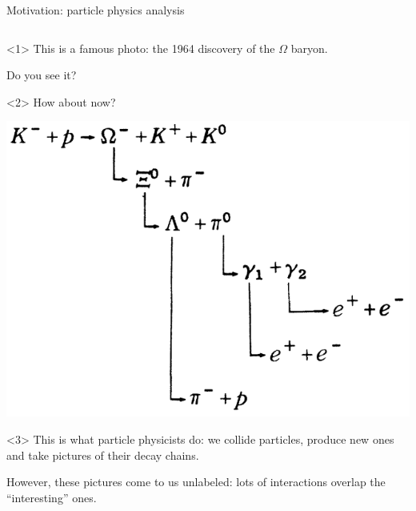 \documentclass[aspectratio=169]{beamer}
\begin{document}
\begin{frame}{Motivation: particle physics analysis}
\begin{columns}
\begin{center}
\begin{onlyenv}<1>
This is a famous photo: the 1964 discovery of the $\Omega$ baryon.

\vspace{1 cm}
Do you see it?

\vspace{1 cm}
\end{onlyenv}\begin{onlyenv}<2>
How about now?

\vspace{0.5 cm}
\includegraphics[width=\linewidth]{decay-chain.png}

\vspace{1 cm}
\end{onlyenv}\begin{onlyenv}<3>
This is what particle physicists do: we collide particles, produce new ones and take pictures of their decay chains.

\vspace{1 cm}
However, these pictures come to us unlabeled: lots of interactions overlap the ``interesting'' ones.

\vspace{1 cm}
\end{onlyenv}
\end{center}

\end{columns}
\end{frame}
\end{document}
